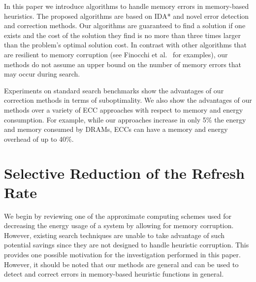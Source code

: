 \documentclass[letterpaper]{article}
\begin{document}
In this paper we introduce algorithms to handle memory errors in memory-based heuristics. %
The proposed algorithms are based on IDA* and novel error detection and correction methods. Our algorithms are guaranteed to find a solution if one exists and the cost of the solution they find is no more than three times larger than the problem's optimal solution cost. In contrast with other algorithms that are resilient to memory corruption (see Finocchi et al.~ for examples), our methods do not assume an upper bound on the number of memory errors that may occur during search.

Experiments on standard search benchmarks show the advantages of our correction methods in terms of suboptimality. We also show the advantages of our methods over a variety of ECC approaches with respect to memory and energy consumption. For example, while our approaches increase in only 5\% the energy and memory consumed by DRAMs, ECCs can have a memory and energy overhead of up to 40\%.

\section{Selective Reduction of the Refresh Rate}

We begin by reviewing one of the approximate computing schemes used for decreasing the energy usage of a system by allowing for memory corruption. However, existing search techniques are unable to take advantage of such potential savings since they are not designed to handle heuristic corruption. This provides one possible motivation for the investigation performed in this paper. However, it should be noted that our methods are general and can be used to detect and correct errors in memory-based heuristic functions in general.
\end{document}
